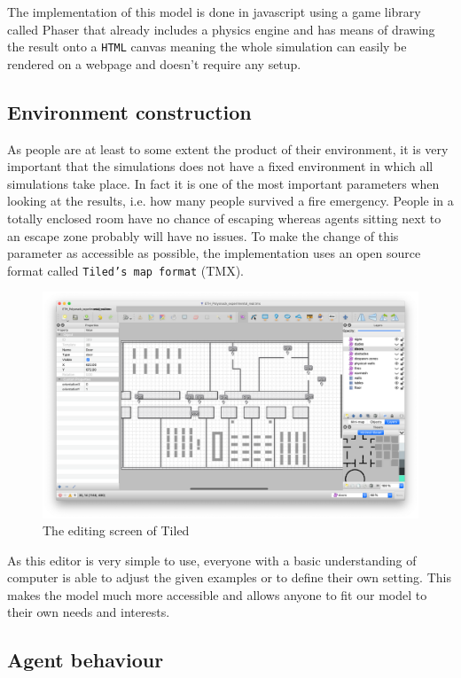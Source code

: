 \documentclass[11pt]{article}
\begin{document}
The implementation of this model is done in javascript using a game library called Phaser \cite{Phaser} that already includes a physics engine and has means of drawing the result onto a \texttt{HTML} canvas meaning the whole simulation can easily be rendered on a webpage and doesn't require any setup.

\subsection{Environment construction}
As people are at least to some extent the product of their environment, it is very important that the simulations does not have a fixed environment in which all simulations take place. In fact it is one of the most important parameters when looking at the results, i.e. how many people survived a fire emergency. People in a totally enclosed room have no chance of escaping whereas agents sitting next to an escape zone probably will have no issues. To make the change of this parameter as accessible as possible, the implementation uses an open source format called \texttt{Tiled's map format} (TMX). \cite{Tiled}

\begin{figure}[H]
	\centering
	\includegraphics[width=1\linewidth]{assets/tiled-editor}\\
	The editing screen of Tiled
\end{figure}

As this editor is very simple to use, everyone with a basic understanding of computer is able to adjust the given examples or to define their own setting. This makes the model much more accessible and allows anyone to fit our model to their own needs and interests.

\subsection{Agent behaviour}
\end{document}
